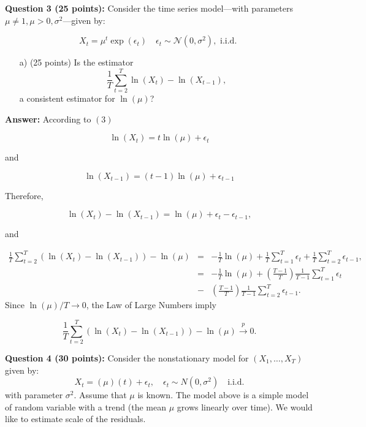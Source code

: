 \documentclass[12] {article}
\begin{document}
\noindent \textbf{Question 3 (25 points):} Consider the time series model---with parameters $\mu \neq 1, \mu>0, \sigma^2$---given by:

\begin{equation}
X_t = \mu^t \exp(\epsilon_t) \quad \epsilon_{t} \sim \mathcal{N}(0,\sigma^2), \textrm{ i.i.d. }
\end{equation}

\begin{itemize}
\item [a)] (25 points) Is the estimator 
\[ \frac{1}{T} \sum_{t=2}^{T} \ln (X_{t}) - \ln (X_{t-1}), \]
a consistent estimator for $\ln(\mu)$?

\end{itemize}

\textbf{Answer:} According to $(3)$ 

\[ \ln(X_t) = t \ln (\mu) + \epsilon_t \]

and

\[ \ln(X_{t-1}) = (t-1) \ln (\mu) + \epsilon_{t-1} \]

Therefore,

\[ \ln(X_t) - \ln(X_{t-1}) = \ln(\mu) + \epsilon_t - \epsilon_{t-1}, \]

and

\begin{eqnarray*}
\frac{1}{T} \sum_{t=2}^{T} \left( \ln (X_{t}) - \ln (X_{t-1}) \right) - \ln(\mu) &=& -\frac{1}{T} \ln(\mu)  + \frac{1}{T} \sum_{t=1}^{T} \epsilon_{t} + \frac{1}{T} \sum_{t=2}^{T} \epsilon_{t-1}, \\
&=& -\frac{1}{T} \ln(\mu)  + \left( \frac{T-1}{T} \right)  \frac{1}{T-1}\sum_{t=1}^{T} \epsilon_{t} \\
&-& \left(\frac{T-1}{T}\right) \frac{1}{T-1} \sum_{t=2}^{T} \epsilon_{t-1}. 
\end{eqnarray*}
Since $\ln(\mu)/T \rightarrow 0$, the Law of Large Numbers imply

\[ \frac{1}{T} \sum_{t=2}^{T} \left( \ln (X_{t}) - \ln (X_{t-1}) \right) - \ln(\mu) \overset{p}{\rightarrow} 0. \]








\noindent \textbf{Question 4 (30 points):} Consider the nonstationary model for $(X_1, \ldots, X_{T})$ given by:
\begin{equation}
X_t = (\mu) (t) + \epsilon_t, \quad \epsilon_t \sim N(0,\sigma^2) \quad \textrm{i.i.d.}
\end{equation}
with parameter $\sigma^2$. Assume that $\mu$ is known. The model above is a simple model of random variable with a trend (the mean $\mu$ grows linearly over time). We would like to estimate scale of the residuals. 
\end{document}
